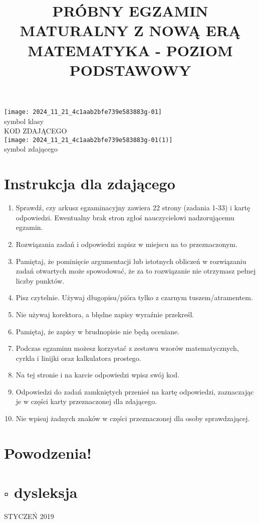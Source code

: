 \documentclass[10pt]{article}
\title{PRÓBNY EGZAMIN MATURALNY Z NOWĄ ERĄ MATEMATYKA - POZIOM PODSTAWOWY }
\author{}
\date{}
\begin{document}
\maketitle
\texttt{[image: 2024\_11\_21\_4c1aab2bfe739e583883g-01]}\\
symbol klasy\\
KOD ZDAJĄCEGO\\
\texttt{[image: 2024\_11\_21\_4c1aab2bfe739e583883g-01(1)]}\\
symbol zdającego

\section*{Instrukcja dla zdającego}
\begin{enumerate}
  \item Sprawdź, czy arkusz egzaminacyjny zawiera 22 strony (zadania 1-33) i kartę odpowiedzi. Ewentualny brak stron zgłoś nauczycielowi nadzorującemu egzamin.
  \item Rozwiązania zadań i odpowiedzi zapisz w miejscu na to przeznaczonym.
  \item Pamiętaj, że pominięcie argumentacji lub istotnych obliczeń w rozwiązaniu zadań otwartych może spowodować, że za to rozwiązanie nie otrzymasz pełnej liczby punktów.
  \item Pisz czytelnie. Używaj długopisu/pióra tylko z czarnym tuszem/atramentem.
  \item Nie używaj korektora, a błędne zapisy wyraźnie przekreśl.
  \item Pamiętaj, że zapisy w brudnopisie nie będą oceniane.
  \item Podczas egzaminu możesz korzystać z zestawu wzorów matematycznych, cyrkla i linijki oraz kalkulatora prostego.
  \item Na tej stronie i na karcie odpowiedzi wpisz swój kod.
  \item Odpowiedzi do zadań zamkniętych przenieś na kartę odpowiedzi, zaznaczając je w części karty przeznaczonej dla zdającego.
  \item Nie wpisuj żadnych znaków w części przeznaczonej dla osoby sprawdzającej.
\end{enumerate}

\section*{Powodzenia!}
\section*{\(\square\) dysleksja}
STYCZEŃ 2019
\end{document}
